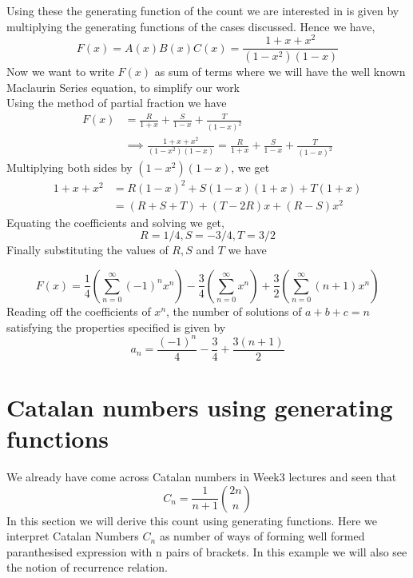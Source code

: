 \noindent Using these the generating function of the count we are interested in  is given by multiplying the generating functions of the cases discussed. Hence we have, $$F(x)=A(x)B(x)C(x)=\frac{1+x+x^2}{(1-x^2)(1-x)}$$
Now we want to write $F(x)$ as sum of terms where we will have the well known Maclaurin Series equation, to simplify our work \\
Using the method of partial fraction we have
\begin{align}
    F(x) &= \frac{R}{1+x}+\frac{S}{1-x}+\frac{T}{(1-x)^2} \nonumber\\
    & \implies \frac{1+x+x^2}{(1-x^2)(1-x)}=\frac{R}{1+x}+\frac{S}{1-x}+\frac{T}{(1-x)^2}
\end{align}
Multiplying both sides by $(1-x^2)(1-x)$, we get
\begin{align*}
    1+x+x^2 &=R(1-x)^2+S(1-x)(1+x)+T(1+x)\\
    &= (R+S+T)+(T-2R)x+(R-S)x^2
\end{align*}
Equating the coefficients and solving we get,
$$R=1/4,S=-3/4,T=3/2$$
Finally substituting the values of $R,S$ and $T$ we have 

$$F(x)=\frac{1}{4}\left(\sum_{n=0}^\infty (-1)^nx^n\right)-\frac{3}{4}\left(\sum_{n=0}^\infty x^n\right)+\frac{3}{2}\left(\sum_{n=0}^\infty (n+1)x^n\right)$$
Reading off the coefficients of $x^n$, the number of solutions of $a+b+c=n$ satisfying the properties specified is given by $$ a_n=\frac{(-1)^n}{4}-\frac{3}{4}+\frac{3(n+1)}{2}$$
\section{Catalan numbers using generating functions}
 We already have come across Catalan numbers in Week3 lectures and seen that $$C_n=\frac{1}{n+1}{2n \choose n }$$
In this section we will derive this count using generating functions. Here we interpret Catalan Numbers $C_n$ as number of ways of forming well formed paranthesised expression with n pairs of brackets. In this example we will also see the notion of recurrence relation.
